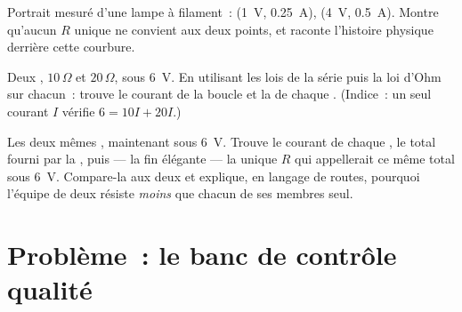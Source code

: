 \begin{exercise}[$\star\star$]\label{exo:g8:ohms-law:10}
Portrait mesuré d'une lampe à filament~: (\qty{1}{V},
\qty{0.25}{A}), (\qty{4}{V}, \qty{0.5}{A}). Montre qu'aucun $R$
unique ne convient aux deux points, et raconte l'histoire physique
derrière cette courbure.
\end{exercise}

\begin{exercise}[$\star\star$]\label{exo:g8:ohms-law:11}
Deux  , $10\,\Omega$ et $20\,\Omega$, sous
\qty{6}{V}. En utilisant les lois de la série puis la loi d'Ohm sur
chacun~: trouve le courant de la boucle et la  de chaque
. (Indice~: un seul courant $I$ vérifie
$6 = 10 I + 20 I$.)
\end{exercise}

\begin{exercise}[$\star\star\star$]\label{exo:g8:ohms-law:12}
Les deux mêmes , maintenant  sous \qty{6}{V}.
Trouve le courant de chaque , le total fourni par la ,
puis --- la fin élégante --- la  unique $R$ qui appellerait
ce même total sous \qty{6}{V}. Compare-la aux deux  et
explique, en langage de routes, pourquoi l'équipe de deux résiste
\emph{moins} que chacun de ses membres seul.
\end{exercise}

\section{Problème~: le banc de contrôle qualité}

